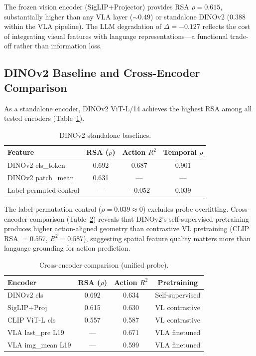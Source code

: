 \documentclass[10pt,twocolumn]{article}
\begin{document}
The frozen vision encoder (SigLIP+Projector) provides RSA $\rho = 0.615$, substantially higher than any VLA layer (${\sim}0.49$) or standalone DINOv2 ($0.388$ within the VLA pipeline).
The LLM degradation of $\Delta = -0.127$ reflects the cost of integrating visual features with language representations---a functional trade-off rather than information loss.

\subsection{DINOv2 Baseline and Cross-Encoder Comparison}
\label{sec:dino_cross}

As a standalone encoder, DINOv2 ViT-L/14 achieves the highest RSA among all tested encoders (Table~\ref{tab:dino_baseline}).

\begin{table}[t]
\centering
\caption{DINOv2 standalone baselines.}
\label{tab:dino_baseline}
\small
\begin{tabular}{lccc}
\toprule
Feature & RSA ($\rho$) & Action $R^2$ & Temporal $\rho$ \\
\midrule
DINOv2 cls\_token & 0.692 & 0.687 & 0.901 \\
DINOv2 patch\_mean & 0.631 & --- & --- \\
Label-permuted control & --- & $-0.052$ & 0.039 \\
\bottomrule
\end{tabular}
\end{table}

The label-permutation control ($\rho = 0.039 \approx 0$) excludes probe overfitting.
Cross-encoder comparison (Table~\ref{tab:cross_encoder}) reveals that DINOv2's self-supervised pretraining produces higher action-aligned geometry than contrastive VL pretraining (CLIP RSA $= 0.557$, $R^2 = 0.587$), suggesting spatial feature quality matters more than language grounding for action prediction.

\begin{table}[t]
\centering
\caption{Cross-encoder comparison (unified probe).}
\label{tab:cross_encoder}
\small
\begin{tabular}{lccc}
\toprule
Encoder & RSA ($\rho$) & Action $R^2$ & Pretraining \\
\midrule
DINOv2 cls & 0.692 & 0.634 & Self-supervised \\
SigLIP+Proj & 0.615 & 0.630 & VL contrastive \\
CLIP ViT-L cls & 0.557 & 0.587 & VL contrastive \\
VLA last\_pre L19 & --- & 0.671 & VLA finetuned \\
VLA img\_mean L19 & --- & 0.599 & VLA finetuned \\
\bottomrule
\end{tabular}
\end{table}
\end{document}
